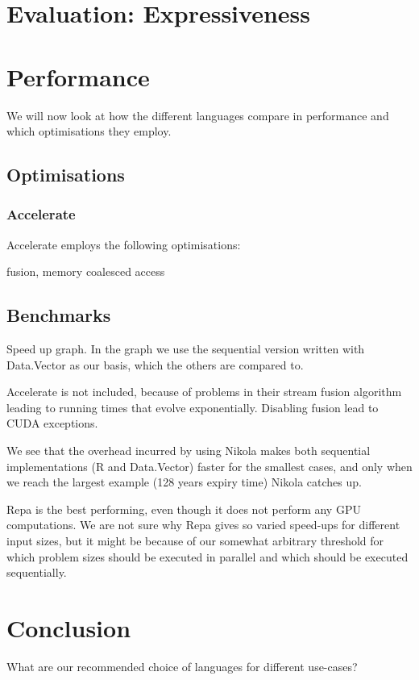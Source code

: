 \chapter{Evaluation: Expressiveness}

\chapter{Performance}
We will now look at how the different languages compare in performance
and which optimisations they employ.

\section{Optimisations}

\subsection{Accelerate}
Accelerate employs the following optimisations:

fusion, memory coalesced access



\section{Benchmarks}
Speed up graph. In the graph we use the sequential version written
with Data.Vector as our basis, which the others are compared to.

Accelerate is not included, because of problems in their stream fusion
algorithm leading to running times that evolve
exponentially. Disabling fusion lead to CUDA exceptions.

We see that the overhead incurred by using Nikola makes both
sequential implementations (R and Data.Vector) faster for the smallest
cases, and only when we reach the largest example (128 years expiry
time) Nikola catches up.

Repa is the best performing, even though it does not perform any GPU
computations. We are not sure why Repa gives so varied speed-ups for
different input sizes, but it might be because of our somewhat
arbitrary threshold for which problem sizes should be executed in
parallel and which should be executed sequentially.


\chapter{Conclusion}
What are our recommended choice of languages for different use-cases?


